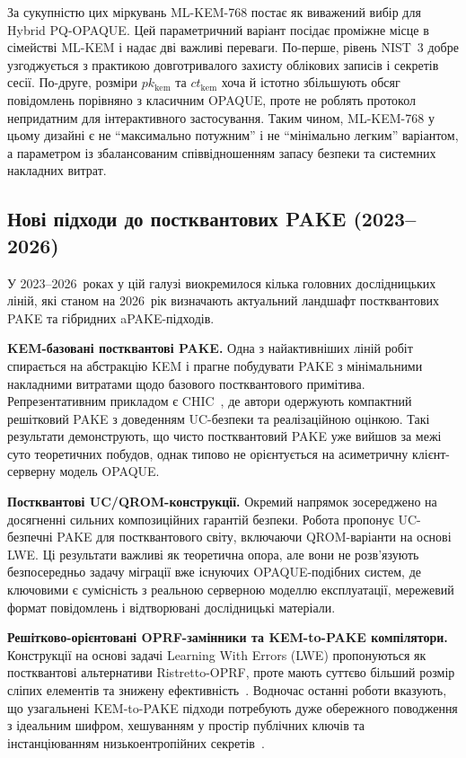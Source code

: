\documentclass{llncs}
\begin{document}
За сукупністю цих міркувань ML-KEM-768 постає як виважений
вибір для Hybrid PQ-OPAQUE. Цей параметричний варіант посідає
проміжне місце в сімействі ML-KEM і надає дві важливі
переваги. По-перше, рівень NIST~3 добре узгоджується з практикою
довготривалого захисту облікових записів і секретів сесії. По-друге,
розміри $pk_{\mathrm{kem}}$ та $ct_{\mathrm{kem}}$ хоча й істотно
збільшують обсяг повідомлень порівняно з класичним OPAQUE, проте не
роблять протокол непридатним для інтерактивного застосування.
Таким чином, ML-KEM-768 у цьому дизайні є не ``максимально
потужним'' і не ``мінімально легким'' варіантом, а параметром із
збалансованим співвідношенням запасу безпеки та системних накладних витрат.

\subsection{Нові підходи до постквантових PAKE (2023--2026)}

У 2023--2026~роках у цій галузі виокремилося кілька головних
дослідницьких ліній, які станом на 2026~рік визначають актуальний
ландшафт постквантових PAKE та гібридних aPAKE-підходів.

\textbf{KEM-базовані постквантові PAKE.} Одна з найактивніших ліній
робіт спирається на абстракцію KEM і прагне побудувати PAKE з
мінімальними накладними витратами щодо базового постквантового
примітива. Репрезентативним прикладом є CHIC~\cite{arriaga2024}, де автори
одержують компактний решітковий PAKE з доведенням UC-безпеки та
реалізаційною оцінкою. Такі результати демонструють, що чисто
постквантовий PAKE уже вийшов за межі суто теоретичних побудов, однак
типово не орієнтується на асиметричну клієнт-серверну модель OPAQUE.

\textbf{Постквантові UC/QROM-конструкції.} Окремий напрямок зосереджено
на досягненні сильних композиційних гарантій безпеки. Робота
\cite{lyu2024uc} пропонує UC-безпечні PAKE для постквантового світу,
включаючи QROM-варіанти на основі LWE. Ці результати важливі як
теоретична опора, але вони не розв'язують безпосередньо задачу
міграції вже існуючих OPAQUE-подібних систем, де ключовими є сумісність
з реальною серверною моделлю експлуатації, мережевий формат повідомлень
і відтворювані дослідницькі матеріали.

\textbf{Решітково-орієнтовані OPRF-замінники та KEM-to-PAKE компілятори.}
Конструкції на основі задачі Learning With Errors (LWE) пропонуються як
постквантові альтернативи Ristretto-OPRF, проте мають суттєво більший розмір
сліпих елементів та знижену ефективність~\cite{beguinet2023}. Водночас
останні роботи вказують, що узагальнені KEM-to-PAKE підходи потребують дуже
обережного поводження з ідеальним шифром, хешуванням у простір
публічних ключів та інстанціюванням низькоентропійних секретів~\cite{arriaga2024}.
\end{document}
